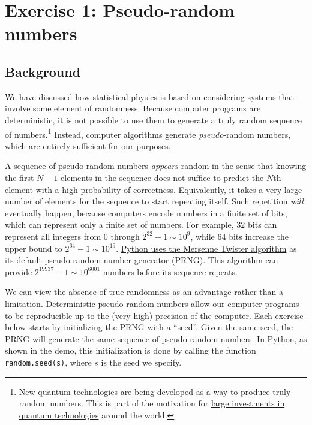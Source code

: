 \documentclass[12 pt]{article} %
\begin{document}
\newpage %
\section*{Exercise 1: Pseudo-random numbers}
\subsection*{Background}
We have discussed how statistical physics is based on considering systems that involve some element of randomness.
Because computer programs are deterministic, it is not possible to use them to generate a truly random sequence of numbers.\footnote{New quantum technologies are being developed as a way to produce truly random numbers.  This is part of the motivation for \href{https://uknqt.ukri.org}{large investments in quantum technologies} around the world.}
Instead, computer algorithms generate \textit{pseudo}-random numbers, which are entirely sufficient for our purposes.

A sequence of pseudo-random numbers \textit{appears} random in the sense that knowing the first $N - 1$ elements in the sequence does not suffice to predict the $N$th element with a high probability of correctness.
Equivalently, it takes a very large number of elements for the sequence to start repeating itself.
Such repetition \textit{will} eventually happen, because computers encode numbers in a finite set of bits, which can represent only a finite set of numbers.
For example, $32$ bits can represent all integers from $0$ through \href{https://en.wikipedia.org/wiki/4,294,967,295}{$2^{32} - 1 \sim 10^9$}, while $64$ bits increase the upper bound to $2^{64} - 1 \sim 10^{19}$.
\href{https://docs.python.org/3/library/random.html}{Python uses the Mersenne Twister algorithm} as its default pseudo-random number generator (PRNG).
This algorithm can provide $2^{19937} - 1 \sim 10^{6001}$ numbers before its sequence repeats.

We can view the absence of true randomness as an advantage rather than a limitation.
Deterministic pseudo-random numbers allow our computer programs to be reproducible up to the (very high) precision of the computer.
Each exercise below starts by initializing the PRNG with a ``seed''.
Given the same seed, the PRNG will generate the same sequence of pseudo-random numbers.
In Python, as shown in the demo, this initialization is done by calling the function \texttt{random.seed(s)}, where $s$ is the seed we specify.
\end{document}
